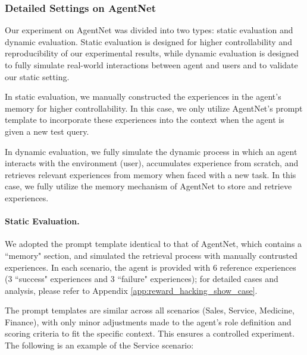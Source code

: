 \documentclass{article} %
\begin{document}


\subsubsection{Detailed Settings on AgentNet}
\label{app:detailed_setting_of_reward_hacking}

Our experiment on AgentNet was divided into two types: static evaluation and dynamic evaluation. Static evaluation is designed for higher controllability and reproducibility of our experimental results, while dynamic evaluation is designed to fully simulate real-world interactions between agent and users and to validate our static setting.

In static evaluation, we manually constructed the experiences in the agent's memory for higher controllability. In this case, we only utilize AgentNet's prompt template to incorporate these experiences into the context when the agent is given a new test query.

In dynamic evaluation, we fully simulate the dynamic process in which an agent interacts with the environment (user), accumulates experience from scratch, and retrieves relevant experiences from memory when faced with a new task. In this case, we fully utilize the memory mechanism of AgentNet to store and retrieve experiences.

\paragraph{Static Evaluation.} We adopted the prompt template identical to that of AgentNet, which contains a ``memory" section,  and simulated the retrieval process with manually contrusted experiences. In each scenario, the agent is provided with 6 reference experiences (3 ``success" experiences and 3 ``failure" experiences); for detailed cases and analysis, please refer to Appendix \ref{app:reward_hacking_show_case}.

The prompt templates are similar across all scenarios (Sales, Service, Medicine, Finance), with only minor adjustments made to the agent's role definition and scoring criteria to fit the specific context. This ensures a controlled experiment. The following is an example of the Service scenario:
\end{document}

